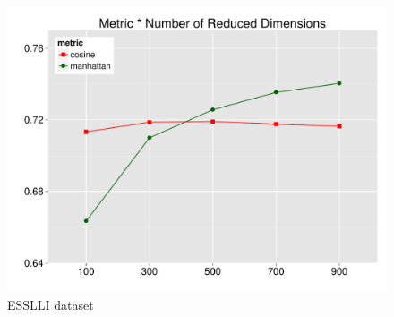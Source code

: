 \documentclass[t]{beamer} %
\begin{document}
\begin{frame}
\begin{columns}
\begin{column}{0.5\textwidth}
      \begin{figure}
        \hspace*{-18pt}   
        \includegraphics[scale=0.30]{img/lapesa_esslli_main_metric_n-dim}
        \vspace{-10pt}
        \caption{ESSLLI dataset}
      \end{figure}
      
    \end{column}
  \end{columns}  
  
\end{frame}
\end{document}
